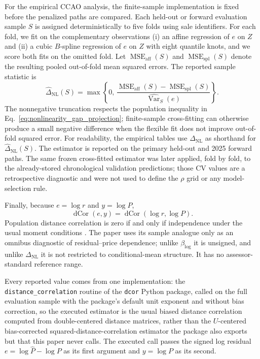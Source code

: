 \documentclass[10pt]{article}
\theoremstyle{definition}
\newcommand{\Var}{\operatorname{Var}}
\newcommand{\1}{\mathbf{1}}
\begin{document}
For the empirical CCAO analysis, the finite-sample implementation is fixed before
the penalized paths are compared. Each held-out or forward evaluation sample $S$ is
assigned deterministically to five folds using sale identifiers. For each fold, we
fit on the complementary observations (i) an affine regression of $e$ on $Z$ and
(ii) a cubic $B$-spline regression of $e$ on $Z$ with eight quantile knots, and we
score both fits on the omitted fold. Let
$\operatorname{MSE}_{\mathrm{aff}}(S)$ and
$\operatorname{MSE}_{\mathrm{spl}}(S)$ denote the resulting pooled out-of-fold mean
squared errors. The reported sample statistic is
\begin{equation}
\label{eq:nonlinearity_gap_estimator}
\widehat{\Delta}_{\mathrm{NL}}(S)
=
\max\left\{
0,\,
\frac{
\operatorname{MSE}_{\mathrm{aff}}(S)
-
\operatorname{MSE}_{\mathrm{spl}}(S)
}{
\widehat{\Var}_S(e)
}
\right\}.
\end{equation}
The nonnegative truncation respects the population inequality in
Eq.~\eqref{eq:nonlinearity_gap_projection}; finite-sample cross-fitting can otherwise
produce a small negative difference when the flexible fit does not improve
out-of-fold squared error. For readability, the empirical tables use
$\Delta_{\mathrm{NL}}$ as shorthand for
$\widehat{\Delta}_{\mathrm{NL}}(S)$.
The estimator is reported on the primary held-out and 2025 forward paths. The same frozen cross-fitted estimator was later applied, fold by fold, to the already-stored chronological validation predictions; those CV values are a retrospective diagnostic and were not used to define the $\rho$ grid or any model-selection rule.

Finally, because $e=\log r$ and $y=\log P$,
\begin{equation}
\label{eq:dcor_diagnostic}
\operatorname{dCor}(e,y)
=
\operatorname{dCor}(\log r,\log P).
\end{equation}
Population distance correlation is zero if and only if independence under
the usual moment conditions \cite{SzekelyRizzoBakirov2007}. The paper uses its
sample analogue only as an omnibus diagnostic of residual--price dependence; unlike
$\beta_{\log}$ it is unsigned, and unlike $\Delta_{\mathrm{NL}}$ it is not restricted
to conditional-mean structure. It has no assessor-standard reference range.

Every reported value comes from one implementation: the
\texttt{distance\_correlation} routine of the \texttt{dcor} Python package, called on the
full evaluation sample with the package's default unit exponent and without bias
correction, so the executed estimator is the usual biased distance correlation computed from
double-centered distance matrices, rather than the $U$-centered bias-corrected
squared-distance-correlation estimator the package also exports but that this paper never calls.
The executed call passes the
signed log residual $e=\log\widehat P-\log P$ as its first argument and $y=\log P$ as its
second.
\end{document}
